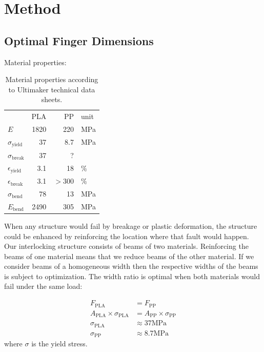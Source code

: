 

\section{Method}


\newpage

\subsection{Optimal Finger Dimensions}
Material properties:
\begin{table}[h!]
\centering
		\caption{Material properties according to Ultimaker technical data sheets.}
		\label{tab:mat_props}
	\begin{tabular}{lrrl}
		& PLA & PP & unit \\
		$E$ & {1820} &  {220} & \si{\mega\pascal} \\
		$\sigma_\text{yield}$ & {37}& {8.7} & \si{\mega\pascal} \\
		$\sigma_\text{break}$ & {37}& ? & \\
		$\epsilon_\text{yield}$ & {3.1}& {18} & \si{\percent} \\
		$\epsilon_\text{break}$ & {3.1} &  $ > 300$  & \si{\percent} \\
		$\sigma_\text{bend}$ & {78} & {13} & \si{\mega\pascal} \\
		$E_\text{bend}$ & {2490}  & {305} & \si{\mega\pascal} \\
	\end{tabular}
\end{table}


When any structure would fail by breakage or plastic deformation,
the structure could be enhanced by reinforcing the location where that fault would happen.
Our interlocking structure consists of beams of two materials.
Reinforcing the beams of one material means that we reduce beams of the other material.
If we consider beams of a homogeneous width then the respective widths of the beams is subject to optimization.
The width ratio is optimal when both materials would fail under the same load:

\begin{align*}
	F_\text{PLA} &= F_\text{PP} \\
	A_\text{PLA} \times \sigma_\text{PLA} &= 	A_\text{PP} \times \sigma_\text{PP}\\
	\sigma_\text{PLA} &\approx 37 \si{\mega\pascal} \\
	\sigma_\text{PP} &\approx 8.7 \si{\mega\pascal}
\end{align*}
where $\sigma$ is the yield stress.

